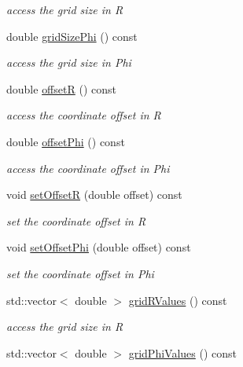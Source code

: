 \begin{DoxyCompactItemize}
\begin{DoxyCompactList}\small\item\em access the grid size in R \end{DoxyCompactList}\item 
double \hyperlink{class_d_d4hep_1_1_geometry_1_1_polar_grid_r_phi2_ae82915d0fc376012be61526b64e08ddc}{grid\+Size\+Phi} () const
\begin{DoxyCompactList}\small\item\em access the grid size in Phi \end{DoxyCompactList}\item 
double \hyperlink{class_d_d4hep_1_1_geometry_1_1_polar_grid_r_phi2_afba2de1b5adf2dc1f595eb44420f8a28}{offsetR} () const
\begin{DoxyCompactList}\small\item\em access the coordinate offset in R \end{DoxyCompactList}\item 
double \hyperlink{class_d_d4hep_1_1_geometry_1_1_polar_grid_r_phi2_ad52c14c502e272ff92d5250b4cb4169e}{offset\+Phi} () const
\begin{DoxyCompactList}\small\item\em access the coordinate offset in Phi \end{DoxyCompactList}\item 
void \hyperlink{class_d_d4hep_1_1_geometry_1_1_polar_grid_r_phi2_a4f2c42e6ddefc2eb08d097caf2f038f6}{set\+OffsetR} (double offset) const
\begin{DoxyCompactList}\small\item\em set the coordinate offset in R \end{DoxyCompactList}\item 
void \hyperlink{class_d_d4hep_1_1_geometry_1_1_polar_grid_r_phi2_ac86b18cc3b90b64633ccd943dd2e0b6e}{set\+Offset\+Phi} (double offset) const
\begin{DoxyCompactList}\small\item\em set the coordinate offset in Phi \end{DoxyCompactList}\item 
std\+::vector$<$ double $>$ \hyperlink{class_d_d4hep_1_1_geometry_1_1_polar_grid_r_phi2_a72dd879af2c16ba00714341c172b8b14}{grid\+R\+Values} () const
\begin{DoxyCompactList}\small\item\em access the grid size in R \end{DoxyCompactList}\item 
std\+::vector$<$ double $>$ \hyperlink{class_d_d4hep_1_1_geometry_1_1_polar_grid_r_phi2_a8f33bfad7556d11d55163283d8a603df}{grid\+Phi\+Values} () const

\end{DoxyCompactItemize}
